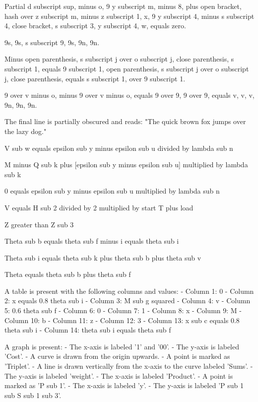 Partial d subscript sup, minus o, 9 y subscript m, minus 8, plus open bracket, hash over z subscript m, minus z subscript 1, x, 9 y subscript 4, minus s subscript 4, close bracket, s subscript 3, y subscript 4, w, equals zero.

9s, 9s, s subscript 9, 9s, 9n, 9n.

Minus open parenthesis, s subscript j over o subscript j, close parenthesis, s subscript 1, equals 9 subscript 1, open parenthesis, s subscript j over o subscript j, close parenthesis, equals s subscript 1, over 9 subscript 1.

9 over v minus o, minus 9 over v minus o, equals 9 over 9, 9 over 9, equals v, v, v, 9n, 9n, 9n.

The final line is partially obscured and reads: "The quick brown fox jumps over the lazy dog."

V sub w equals epsilon sub y minus epsilon sub u divided by lambda sub n

M minus Q sub k plus [epsilon sub y minus epsilon sub u] multiplied by lambda sub k

0 equals epsilon sub y minus epsilon sub u multiplied by lambda sub n

V equals H sub 2 divided by 2 multiplied by start T plus load

Z greater than Z sub 3

Theta sub b equals theta sub f minus i equals theta sub i

Theta sub i equals theta sub k plus theta sub b plus theta sub v

Theta equals theta sub b plus theta sub f

A table is present with the following columns and values:
- Column 1: 0
- Column 2: x equals 0.8 theta sub i
- Column 3: M sub g squared
- Column 4: v
- Column 5: 0.6 theta sub f
- Column 6: 0
- Column 7: 1
- Column 8: x
- Column 9: M
- Column 10: b
- Column 11: z
- Column 12: 3
- Column 13: x sub c equals 0.8 theta sub i
- Column 14: theta sub i equals theta sub f

A graph is present:
- The x-axis is labeled '1' and '00'.
- The y-axis is labeled 'Cost'.
- A curve is drawn from the origin upwards.
- A point is marked as 'Triplet'.
- A line is drawn vertically from the x-axis to the curve labeled 'Sums'.
- The y-axis is labeled 'weight'.
- The x-axis is labeled 'Product'.
- A point is marked as 'P sub 1'.
- The x-axis is labeled 'y'.
- The y-axis is labeled 'P sub 1 sub S sub 1 sub 3'.
